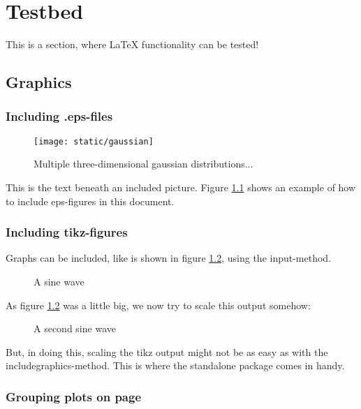 \chapter[Testbed]{Testbed}
\label{chap:Testbed}
This is a section, where LaTeX functionality can be tested!
\section{Graphics}
\subsection{Including .eps-files}

\begin{figure}[H]
\centering
\texttt{[image: static/gaussian]}
\caption{Multiple three-dimensional gaussian distributions...}
\label{fig:mog}
\end{figure}


This is the text beneath an included picture. Figure \ref{fig:mog} shows an example of how to include eps-figures in this document.

\subsection{Including tikz-figures}
Graphs can be included, like is shown in figure \ref{fig:sin}, using the input-method.
\begin{figure}[H]
	\centering
	
	\caption{A sine wave}
	\label{fig:sin}
\end{figure}

As figure \ref{fig:sin} was a little big, we now try to scale this output somehow:

\begin{figure}[H]
	\centering
	
	\caption{A second sine wave}
	\label{fig:sin2}
\end{figure}

But, in doing this, scaling the tikz output might not be as easy as with the includegraphics-method. This is where the standalone package comes in handy.

\subsection{Grouping plots on page}
